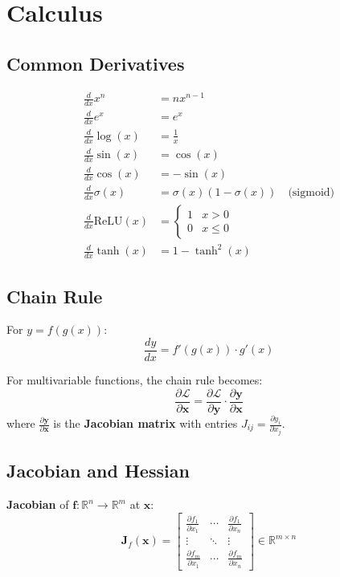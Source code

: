 \section{Calculus}

\subsection{Common Derivatives}

\begin{align}
\frac{d}{dx}x^n &= nx^{n-1} \\
\frac{d}{dx}e^x &= e^x \\
\frac{d}{dx}\log(x) &= \frac{1}{x} \\
\frac{d}{dx}\sin(x) &= \cos(x) \\
\frac{d}{dx}\cos(x) &= -\sin(x) \\
\frac{d}{dx}\sigma(x) &= \sigma(x)(1 - \sigma(x)) \quad \text{(sigmoid)} \\
\frac{d}{dx}\text{ReLU}(x) &= \begin{cases} 1 & x > 0 \\ 0 & x \leq 0 \end{cases} \\
\frac{d}{dx}\tanh(x) &= 1 - \tanh^2(x)
\end{align}

\subsection{Chain Rule}

For $y = f(g(x))$:
\begin{equation}
\frac{dy}{dx} = f'(g(x)) \cdot g'(x)
\end{equation}

For multivariable functions, the chain rule becomes:
\begin{equation}
\frac{\partial \mathcal{L}}{\partial \mathbf{x}} = \frac{\partial \mathcal{L}}{\partial \mathbf{y}} \cdot \frac{\partial \mathbf{y}}{\partial \mathbf{x}}
\end{equation}
where $\frac{\partial \mathbf{y}}{\partial \mathbf{x}}$ is the \textbf{Jacobian matrix} with entries $J_{ij} = \frac{\partial y_i}{\partial x_j}$.

\subsection{Jacobian and Hessian}

\textbf{Jacobian} of $\mathbf{f}: \mathbb{R}^n \to \mathbb{R}^m$ at $\mathbf{x}$:
\begin{equation}
\mathbf{J}_f(\mathbf{x}) = \begin{bmatrix}
\frac{\partial f_1}{\partial x_1} & \cdots & \frac{\partial f_1}{\partial x_n} \\
\vdots & \ddots & \vdots \\
\frac{\partial f_m}{\partial x_1} & \cdots & \frac{\partial f_m}{\partial x_n}
\end{bmatrix} \in \mathbb{R}^{m \times n}
\end{equation}

